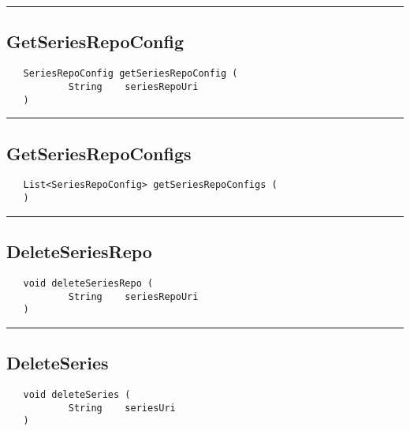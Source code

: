 \rule{15cm}{2pt}
\subsection{GetSeriesRepoConfig}
\label{Api:GetSeriesRepoConfig}
\begin{verbatim}
   SeriesRepoConfig getSeriesRepoConfig (
           String    seriesRepoUri
   )
\end{verbatim}



\rule{15cm}{2pt}
\subsection{GetSeriesRepoConfigs}
\label{Api:GetSeriesRepoConfigs}
\begin{verbatim}
   List<SeriesRepoConfig> getSeriesRepoConfigs (
   )
\end{verbatim}



\rule{15cm}{2pt}
\subsection{DeleteSeriesRepo}
\label{Api:DeleteSeriesRepo}
\begin{verbatim}
   void deleteSeriesRepo (
           String    seriesRepoUri
   )
\end{verbatim}



\rule{15cm}{2pt}
\subsection{DeleteSeries}
\label{Api:DeleteSeries}
\begin{verbatim}
   void deleteSeries (
           String    seriesUri
   )
\end{verbatim}



